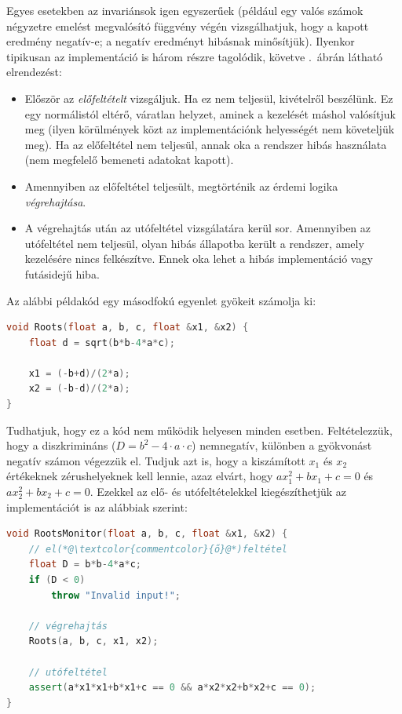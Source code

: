 Egyes esetekben az invariánsok igen egyszerűek (például egy valós számok négyzetre emelést megvalósító függvény végén vizsgálhatjuk, hogy a kapott eredmény negatív-e; a negatív eredményt hibásnak minősítjük). Ilyenkor tipikusan az implementáció is három részre tagolódik, követve .~ábrán látható elrendezést:
\begin{itemize}
\item Először az \emph{előfeltételt} vizsgáljuk. Ha ez nem teljesül, kivételről beszélünk. Ez egy normálistól eltérő, váratlan helyzet, aminek a kezelését máshol valósítjuk meg (ilyen körülmények közt az implementációnk helyességét nem követeljük meg). Ha az előfeltétel nem teljesül, annak oka a rendszer hibás használata (nem megfelelő bemeneti adatokat kapott).
\item Amennyiben az előfeltétel teljesült, megtörténik az érdemi logika \emph{végrehajtása}.
\item A végrehajtás után az utófeltétel vizsgálatára kerül sor. Amennyiben az utófeltétel nem teljesül, olyan hibás állapotba került a rendszer, amely kezelésére nincs felkészítve. Ennek oka lehet a hibás implementáció vagy futásidejű hiba.
\end{itemize}

\begin{megjegyzes}
Az alábbi példakód egy másodfokú egyenlet gyökeit számolja ki:

\begin{lstlisting}[language=C++]
void Roots(float a, b, c, float &x1, &x2) {
    float d = sqrt(b*b-4*a*c);

    x1 = (-b+d)/(2*a);
    x2 = (-b-d)/(2*a);
}
\end{lstlisting}

Tudhatjuk, hogy ez a kód nem működik helyesen minden esetben. Feltételezzük, hogy a diszkrimináns ($D=b^2-4\cdot a\cdot c$) nemnegatív, különben a gyökvonást negatív számon végezzük el. Tudjuk azt is, hogy a kiszámított $x_1$ és $x_2$ értékeknek zérushelyeknek kell lennie, azaz elvárt, hogy $ax_1^2 + bx_1 + c = 0$ és $ax_2^2 + bx_2 + c = 0$. Ezekkel az elő- és utófeltételekkel kiegészíthetjük az implementációt is az alábbiak szerint:


\begin{lstlisting}[language=C++,morekeywords={assert}]
void RootsMonitor(float a, b, c, float &x1, &x2) {
    // el(*@\textcolor{commentcolor}{ő}@*)feltétel
    float D = b*b-4*a*c;
    if (D < 0)
        throw "Invalid input!";

    // végrehajtás
    Roots(a, b, c, x1, x2);

    // utófeltétel
    assert(a*x1*x1+b*x1+c == 0 && a*x2*x2+b*x2+c == 0);
}
\end{lstlisting}
\end{megjegyzes}

